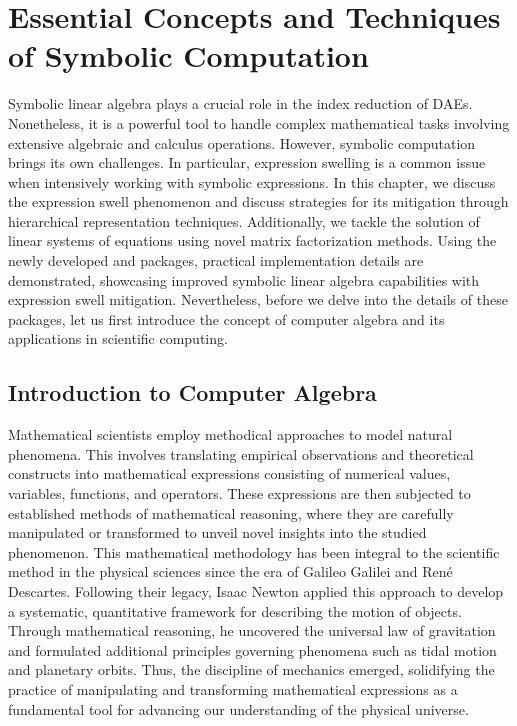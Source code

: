 
\chapter[Symbolic Computation Essentials]{Essential Concepts and Techniques of Symbolic Computation}
\label{chap3:symbolic_computation}

Symbolic linear algebra plays a crucial role in the index reduction of \acp{DAE}. Nonetheless, it is a powerful tool to handle complex mathematical tasks involving extensive algebraic and calculus operations. However, symbolic computation brings its own challenges. In particular, expression swelling is a common issue when intensively working with symbolic expressions. In this chapter, we discuss the expression swell phenomenon and discuss strategies for its mitigation through hierarchical representation techniques. Additionally, we tackle the solution of linear systems of equations using novel matrix factorization methods. Using the newly developed \LEM{} and \LAST{} \Maple{} packages, practical implementation details are demonstrated, showcasing improved symbolic linear algebra capabilities with expression swell mitigation. Nevertheless, before we delve into the details of these packages, let us first introduce the concept of computer algebra and its applications in scientific computing.


\section{Introduction to Computer Algebra}
\label{chap2:sec:cas}

Mathematical scientists employ methodical approaches to model natural phenomena. This involves translating empirical observations and theoretical constructs into mathematical expressions consisting of numerical values, variables, functions, and operators. These expressions are then subjected to established methods of mathematical reasoning, where they are carefully manipulated or transformed to unveil novel insights into the studied phenomenon. This mathematical methodology has been integral to the scientific method in the physical sciences since the era of Galileo Galilei and Ren{\'e} Descartes. Following their legacy, Isaac Newton applied this approach to develop a systematic, quantitative framework for describing the motion of objects. Through mathematical reasoning, he uncovered the universal law of gravitation and formulated additional principles governing phenomena such as tidal motion and planetary orbits. Thus, the discipline of mechanics emerged, solidifying the practice of manipulating and transforming mathematical expressions as a fundamental tool for advancing our understanding of the physical universe.

